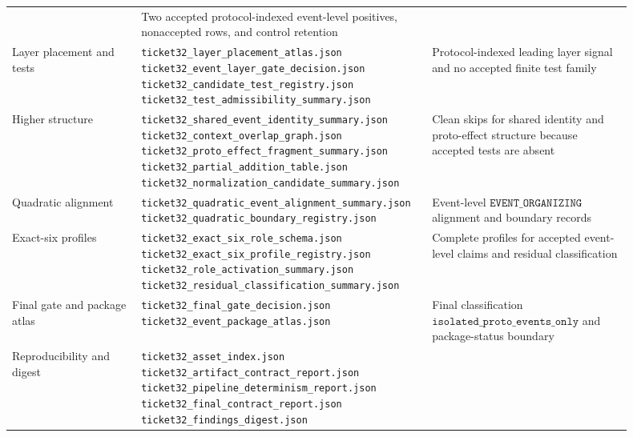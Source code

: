 \documentclass[11pt]{article}
\theoremstyle{definition}
\begin{document}
\begin{table}[h]
{\begin{tabular}{p{0.20\linewidth}p{0.39\linewidth}p{0.31\linewidth}}
&
Two accepted protocol-indexed event-level positives, nonaccepted rows, and control retention
\\[0.8em]
Layer placement and tests
&
\shortstack[l]{\texttt{ticket32\_layer\_placement\_atlas.json}\\\texttt{ticket32\_event\_layer\_gate\_decision.json}\\\texttt{ticket32\_candidate\_test\_registry.json}\\\texttt{ticket32\_test\_admissibility\_summary.json}}
&
Protocol-indexed leading layer signal and no accepted finite test family
\\[0.8em]
Higher structure
&
\shortstack[l]{\texttt{ticket32\_shared\_event\_identity\_summary.json}\\\texttt{ticket32\_context\_overlap\_graph.json}\\\texttt{ticket32\_proto\_effect\_fragment\_summary.json}\\\texttt{ticket32\_partial\_addition\_table.json}\\\texttt{ticket32\_normalization\_candidate\_summary.json}}
&
Clean skips for shared identity and proto-effect structure because accepted tests are absent
\\[0.8em]
Quadratic alignment
&
\shortstack[l]{\texttt{ticket32\_quadratic\_event\_alignment\_summary.json}\\\texttt{ticket32\_quadratic\_boundary\_registry.json}}
&
Event-level \(\texttt{EVENT\_ORGANIZING}\) alignment and boundary records
\\[0.8em]
Exact-six profiles
&
\shortstack[l]{\texttt{ticket32\_exact\_six\_role\_schema.json}\\\texttt{ticket32\_exact\_six\_profile\_registry.json}\\\texttt{ticket32\_role\_activation\_summary.json}\\\texttt{ticket32\_residual\_classification\_summary.json}}
&
Complete profiles for accepted event-level claims and residual classification
\\[0.8em]
Final gate and package atlas
&
\shortstack[l]{\texttt{ticket32\_final\_gate\_decision.json}\\\texttt{ticket32\_event\_package\_atlas.json}}
&
Final classification \(\texttt{isolated\_proto\_events\_only}\) and package-status boundary
\\[0.8em]
Reproducibility and digest
&
\shortstack[l]{\texttt{ticket32\_asset\_index.json}\\\texttt{ticket32\_artifact\_contract\_report.json}\\\texttt{ticket32\_pipeline\_determinism\_report.json}\\\texttt{ticket32\_final\_contract\_report.json}\\\texttt{ticket32\_findings\_digest.json}}

\end{tabular}}
\end{table}
\end{document}
